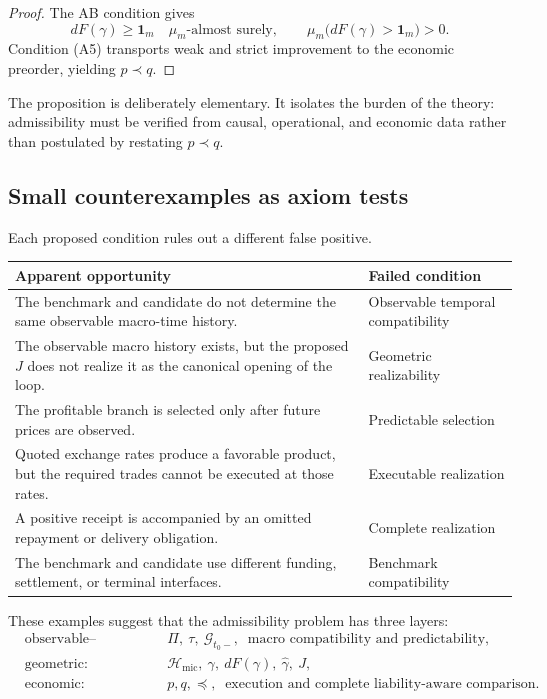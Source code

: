 \documentclass[11pt,a4paper]{article}
\newcommand{\Hmic}{\mathcal H_{\mathrm{mic}}}
\begin{document}
\begin{proof}
The AB condition gives
\[
  dF(\gamma)\geq\mathbf1_m
  \quad\mu_m\text{-almost surely},
  \qquad
  \mu_m\bigl(dF(\gamma)>\mathbf1_m\bigr)>0.
\]
Condition (A5) transports weak and strict improvement to the economic
preorder, yielding \(p\prec q\).
\end{proof}

The proposition is deliberately elementary. It isolates the burden of the
theory: admissibility must be verified from causal, operational, and economic
data rather than postulated by restating \(p\prec q\).


\subsection{Small counterexamples as axiom tests}
\label{sec:axiomTests}


Each proposed condition rules out a different false positive.

\begin{center}
\begin{tabular}{p{} p{}}
\toprule
\textbf{Apparent opportunity} & \textbf{Failed condition}\\
\midrule
The benchmark and candidate do not determine the same observable macro-time
history. & Observable temporal compatibility\\
The observable macro history exists, but the proposed \(J\) does not realize
it as the canonical opening of the loop. & Geometric realizability\\
The profitable branch is selected only after future prices are observed.
& Predictable selection\\
Quoted exchange rates produce a favorable product, but the required trades
cannot be executed at those rates. & Executable realization\\
A positive receipt is accompanied by an omitted repayment or delivery
obligation. & Complete realization\\
The benchmark and candidate use different funding, settlement, or terminal
interfaces. & Benchmark compatibility\\
\bottomrule
\end{tabular}
\end{center}

These examples suggest that the admissibility problem has three layers:
\[
\boxed{
\begin{aligned}
&\text{observable--temporal:}&&
  \Pi,\ \tau,\ \mathcal G_{t_0-},\
  \text{ macro compatibility and predictability},\\
&\text{geometric:}&&
  \Hmic,\ \gamma,\ dF(\gamma),\ \widehat\gamma,\ J,\\
&\text{economic:}&&
  p,q,\preceq,\
  \text{ execution and complete liability-aware comparison}.
\end{aligned}}
\]
\end{document}
